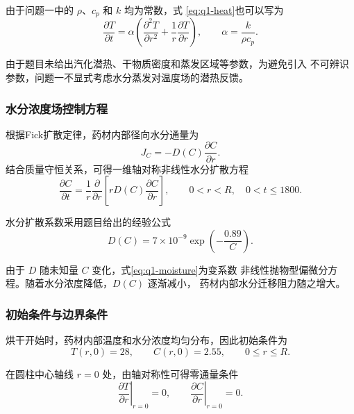 \documentclass[12pt,a4paper]{article}
\begin{document}
由于问题一中的 $\rho$、$c_p$ 和 $k$ 均为常数，式
\eqref{eq:q1-heat}也可以写为
\begin{equation}
\frac{\partial T}{\partial t}
=
\alpha
\left(
\frac{\partial^2T}{\partial r^2}
+
\frac{1}{r}\frac{\partial T}{\partial r}
\right),
\qquad
\alpha=\frac{k}{\rho c_p}.
\end{equation}

由于题目未给出汽化潜热、干物质密度和蒸发区域等参数，为避免引入
不可辨识参数，问题一不显式考虑水分蒸发对温度场的潜热反馈。

\subsubsection{水分浓度场控制方程}

根据Fick扩散定律，药材内部径向水分通量为
\begin{equation}
J_C=-D(C)\frac{\partial C}{\partial r}.
\end{equation}
结合质量守恒关系，可得一维轴对称非线性水分扩散方程
\begin{equation}
\boxed{
\frac{\partial C}{\partial t}
=
\frac{1}{r}
\frac{\partial}{\partial r}
\left[
rD(C)\frac{\partial C}{\partial r}
\right]
},
\qquad
0<r<R,\quad 0<t\le1800.
\label{eq:q1-moisture}
\end{equation}

水分扩散系数采用题目给出的经验公式
\begin{equation}
\boxed{
D(C)
=
7\times10^{-9}
\exp\left(-\frac{0.89}{C}\right)
}.
\label{eq:q1-diffusivity}
\end{equation}

由于 $D$ 随未知量 $C$ 变化，式\eqref{eq:q1-moisture}为变系数
非线性抛物型偏微分方程。随着水分浓度降低，$D(C)$ 逐渐减小，
药材内部水分迁移阻力随之增大。

\subsubsection{初始条件与边界条件}

烘干开始时，药材内部温度和水分浓度均匀分布，因此初始条件为
\begin{equation}
\boxed{
T(r,0)=28,\qquad C(r,0)=2.55
},
\qquad 0\le r\le R.
\label{eq:q1-initial}
\end{equation}

在圆柱中心轴线 $r=0$ 处，由轴对称性可得零通量条件
\begin{equation}
\boxed{
\left.\frac{\partial T}{\partial r}\right|_{r=0}=0,
\qquad
\left.\frac{\partial C}{\partial r}\right|_{r=0}=0
}.
\label{eq:q1-center}
\end{equation}
\end{document}
